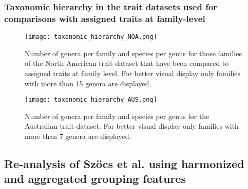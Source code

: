 \documentclass[../Draft_harmonization_paper.tex]{subfiles}
\begin{document}
\subsubsection*{Taxonomic hierarchy in the trait datasets used for comparisons with assigned traits at family-level}
\label{sec:taxonomic_hierarchy}

\begin{figure}[H]
    \centering
    \texttt{[image: taxonomic\_hierarchy\_NOA.png]}
    \caption{Number of genera per family and species per genus for those families of the North American trait dataset that have been compared to assigned traits at family level. For better visual display only families with more than 15 genera are displayed.}
    \label{fig:tax_hierarchy_NOA}
\end{figure}

\begin{figure}[H]
    \centering
    \texttt{[image: taxonomic\_hierarchy\_AUS.png]}
    \caption{Number of genera per family and species per genus for the Australian trait dataset. For better visual display only families with more than 7 genera are displayed.}
    \label{fig:tax_hierarchy_AUS}
\end{figure}


\newpage

\subsection*{Re-analysis of Szöcs et al. using harmonized and aggregated grouping features}
\end{document}
